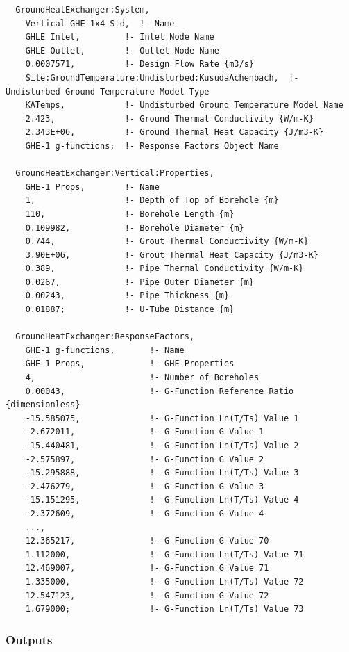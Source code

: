 \begin{lstlisting}
  GroundHeatExchanger:System,
    Vertical GHE 1x4 Std,  !- Name
    GHLE Inlet,         !- Inlet Node Name
    GHLE Outlet,        !- Outlet Node Name
    0.0007571,          !- Design Flow Rate {m3/s}
    Site:GroundTemperature:Undisturbed:KusudaAchenbach,  !- Undisturbed Ground Temperature Model Type
    KATemps,            !- Undisturbed Ground Temperature Model Name
    2.423,              !- Ground Thermal Conductivity {W/m-K}
    2.343E+06,          !- Ground Thermal Heat Capacity {J/m3-K}
    GHE-1 g-functions;  !- Response Factors Object Name

  GroundHeatExchanger:Vertical:Properties,
    GHE-1 Props,        !- Name
    1,                  !- Depth of Top of Borehole {m}
    110,                !- Borehole Length {m}
    0.109982,           !- Borehole Diameter {m}
    0.744,              !- Grout Thermal Conductivity {W/m-K}
    3.90E+06,           !- Grout Thermal Heat Capacity {J/m3-K}
    0.389,              !- Pipe Thermal Conductivity {W/m-K}
    0.0267,             !- Pipe Outer Diameter {m}
    0.00243,            !- Pipe Thickness {m}
    0.01887;            !- U-Tube Distance {m}

  GroundHeatExchanger:ResponseFactors,
    GHE-1 g-functions,       !- Name
    GHE-1 Props,             !- GHE Properties
    4,                       !- Number of Boreholes
    0.00043,                 !- G-Function Reference Ratio {dimensionless}
    -15.585075,              !- G-Function Ln(T/Ts) Value 1
    -2.672011,               !- G-Function G Value 1
    -15.440481,              !- G-Function Ln(T/Ts) Value 2
    -2.575897,               !- G-Function G Value 2
    -15.295888,              !- G-Function Ln(T/Ts) Value 3
    -2.476279,               !- G-Function G Value 3
    -15.151295,              !- G-Function Ln(T/Ts) Value 4
    -2.372609,               !- G-Function G Value 4
    ...,
    12.365217,               !- G-Function G Value 70
    1.112000,                !- G-Function Ln(T/Ts) Value 71
    12.469007,               !- G-Function G Value 71
    1.335000,                !- G-Function Ln(T/Ts) Value 72
    12.547123,               !- G-Function G Value 72
    1.679000;                !- G-Function Ln(T/Ts) Value 73
\end{lstlisting}

\subsubsection{Outputs}\label{outputs-10-000}

